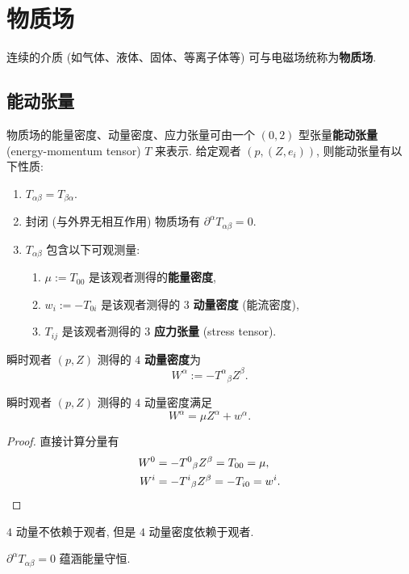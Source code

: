 \section{物质场}
连续的介质 (如气体、液体、固体、等离子体等) 可与电磁场统称为{\bf 物质场}. 
\subsection{能动张量}
物质场的能量密度、动量密度、应力张量可由一个 $ (0,2) $ 型张量{\bf 能动张量} (energy-momentum tensor) $ T $ 来表示. 给定观者 $(p,(Z,e_i))$, 则能动张量有以下性质:
\begin{enumerate}
    \item $ T_{\alpha\beta}=T_{\beta\alpha} $.
    \item 封闭 (与外界无相互作用) 物质场有 $ \partial^\alpha T_{\alpha\beta}=0 $.
    \item $T_{\alpha\beta}$ 包含以下可观测量:
        \begin{enumerate}
            \item $ \mu:=T_{00} $ 是该观者测得的{\bf 能量密度},
            \item $ w_i:=-T_{0i} $ 是该观者测得的 $ 3 $ {\bf 动量密度} (能流密度),
            \item $ T_{ij} $ 是该观者测得的 $ 3 $ {\bf 应力张量} (stress tensor).
        \end{enumerate}
\end{enumerate}
\begin{definition}[$ 4 $ 动量密度]
    瞬时观者 $ (p,Z) $ 测得的 $ 4 $ {\bf 动量密度}为
    \[ W^\alpha:=-T^\alpha{}_\beta Z^\beta. \]
\end{definition}
\begin{proposition}
    瞬时观者 $ (p,Z) $ 测得的 $ 4 $ 动量密度满足
    \[ W^\alpha=\mu Z^\alpha+w^\alpha. \]
\end{proposition}
\begin{proof}
    直接计算分量有
    \begin{align*}
        W^0 &= -T^0{}_\beta Z^\beta=T_{00}=\mu,\\
        W^i &= -T^i{}_\beta Z^\beta=-T_{i0}=w^i.\qedhere
    \end{align*}
\end{proof}
\begin{remark}
    $ 4 $ 动量不依赖于观者, 但是 $ 4 $ 动量密度依赖于观者.
\end{remark}
\begin{proposition}
    $ \partial^\alpha T_{\alpha\beta}=0 $ 蕴涵能量守恒.
\end{proposition}
